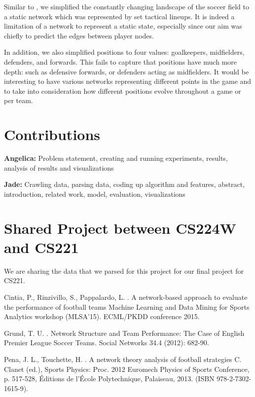 \documentclass[11pt,letterpaper]{article}
\begin{document}
Similar to \cite{Pena:12}, we simplified the constantly changing landscape of the soccer field to a static network which was represented by set tactical lineups. It is indeed a limitation of a network to represent a static state, especially since our aim was chiefly to predict the edges between player nodes. 

In addition, we also simplified positions to four values: goalkeepers, midfielders, defenders, and forwards. This fails to capture that positions have much more depth: such as defensive forwards, or defenders acting as midfielders. It would be interesting to have various networks representing different points in the game and to take into consideration how different positions evolve throughout a game or per team.


\section{Contributions}
\noindent \textbf{Angelica:} Problem statement, creating and running experiments, results, analysis of results and visualizations

\noindent \textbf{Jade:} Crawling data, parsing data, coding up algorithm and features, abstract, introduction, related work, model, evaluation, visualizations

\section{Shared Project between CS224W and CS221}
We are sharing the data that we parsed for this project for our final project for CS221.



\begin{thebibliography}{9}
Cintia, P., Rinzivillo, S., Pappalardo, L.
.
\newblock A network-based approach to evaluate the performance of football teams
\newblock Machine Learning and Data Mining for Sports Analytics workshop (MLSA'15).
\newblock ECML/PKDD conference 2015.

Grund, T. U.
.
\newblock Network Structure and Team Performance: The Case of English Premier League Soccer Teams.
\newblock Social Networks 34.4 (2012): 682-90.

Pena, J. L., Touchette, H.
.
\newblock A network theory analysis of football strategies
\newblock C. Clanet (ed.), Sports Physics: Proc. 2012 Euromech Physics of Sports Conference, p. 517-528, \'Editions de l'\'Ecole Polytechnique, Palaiseau, 2013. (ISBN 978-2-7302-1615-9).
 \end{thebibliography}
\end{document}
